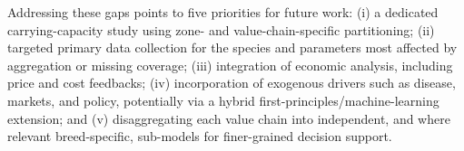Addressing these gaps points to five priorities for future work: (i) a dedicated carrying-capacity study using zone- and value-chain-specific partitioning; (ii) targeted primary data collection for the species and parameters most affected by aggregation or missing coverage; (iii) integration of economic analysis, including price and cost feedbacks; (iv) incorporation of exogenous drivers such as disease, markets, and policy, potentially via a hybrid first-principles/machine-learning extension; and (v) disaggregating each value chain into independent, and where relevant breed-specific, sub-models for finer-grained decision support.
